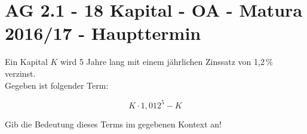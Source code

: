 \section{AG 2.1 - 18 Kapital - OA - Matura 2016/17 - Haupttermin}

\begin{beispiel}[AG 2.1]{1} %
Ein Kapital $K$ wird 5 Jahre lang mit einem jährlichen Zinssatz von 1,2\,\% verzinst.\\
			
Gegeben ist folgender Term:

\[K\cdot 1,012^5-K\] 

Gib die Bedeutung dieses Terms im gegebenen Kontext an!

\end{beispiel}